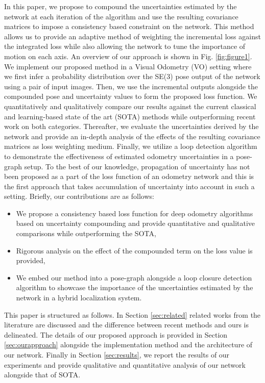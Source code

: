 \documentclass[letterpaper, 10 pt]{ieeeconf}  %
\begin{document}
In this paper, we propose to compound the uncertainties estimated by the network at each iteration of the algorithm and use the resulting covariance matrices to impose a consistency based constraint on the network. This method allows us to provide an adaptive method of weighting the incremental loss against the integrated loss while also allowing the network to tune the importance of motion on each axis. An overview of our approach is shown in Fig. \ref{fig:figure1}. We implement our proposed method in a Visual Odometry (VO) setting where we first infer a probability distribution over the SE(3) pose output of the network using a pair of input images. Then, we use the incremental outputs alongside the compounded pose and uncertainty values to form the proposed loss function. We quantitatively and qualitatively compare our results against the current classical and learning-based state of the art (SOTA) methods while outperforming recent work on both categories. Thereafter, we evaluate the uncertainties derived by the network and provide an in-depth analysis of the effects of the resulting covariance matrices as loss weighting medium. Finally, we utilize a loop detection algorithm to demonstrate the effectiveness of estimated odometry uncertainties in a pose-graph setup. To the best of our knowledge, propagation of uncertainty has not been proposed as a part of the loss function of an odometry network and this is the first approach that takes accumulation of uncertainty into account in such a setting. Briefly, our contributions are as follows:
\begin{itemize}
    \item We propose a consistency based loss function for deep odometry algorithms based on uncertainty compounding and provide quantitative and qualitative comparisons while outperforming the SOTA,
    \item Rigorous analysis on the effect of the compounded term on the loss value is provided,
    \item We embed our method into a pose-graph alongside a loop closure detection algorithm to showcase the importance of the uncertainties estimated by the network in a hybrid localization system.
\end{itemize}
This paper is structured as follows. In Section \ref{sec:related} related works from the literature are discussed and the difference between recent methods and ours is delineated. The details of our proposed approach is provided in Section \ref{sec:ourapproach} alongside the implementation method and the architecture of our network. Finally in Section \ref{sec:results}, we report the results of our experiments and provide qualitative and quantitative analysis of our network alongside that of SOTA.
\end{document}
